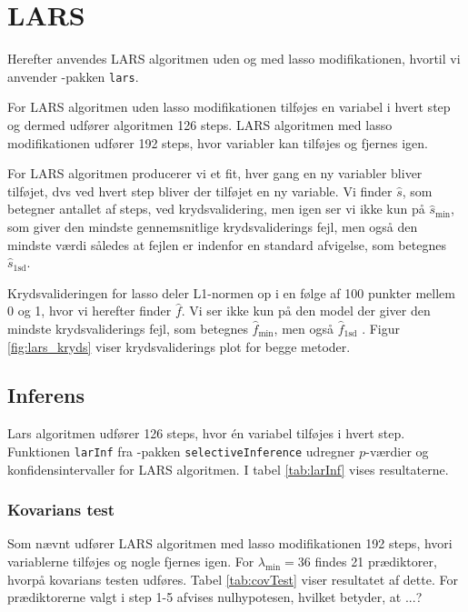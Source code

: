 \section{LARS}
Herefter anvendes LARS algoritmen uden og med lasso modifikationen, hvortil vi anvender \Rlang-pakken \texttt{lars}.

For LARS algoritmen uden lasso modifikationen tilføjes en variabel i hvert step og dermed udfører algoritmen 126 steps.
LARS algoritmen med lasso modifikationen udfører 192 steps, hvor variabler kan tilføjes og fjernes igen.



For LARS algoritmen producerer vi et fit, hver gang en ny variabler bliver tilføjet, dvs ved hvert step bliver der tilføjet en ny variable. 
Vi finder $\widehat{s}$, som betegner antallet af steps, ved krydsvalidering, men igen ser vi ikke kun på  $\widehat{s}_{\min}$, som giver den mindste gennemsnitlige krydsvaliderings fejl, men også den mindste værdi således at fejlen er indenfor en standard afvigelse, som betegnes $\widehat{s}_{\text{1sd}}$. 

Krydsvalideringen for lasso deler L1-normen op i en følge af 100 punkter mellem 0 og 1, hvor vi herefter finder $\widehat{f}$. Vi ser ikke kun på den model der giver den mindste krydsvaliderings fejl, som betegnes  $\widehat{f}_{\min}$, men også  $\widehat{f}_{\text{1sd}}$ . 
Figur \ref{fig:lars_kryds} viser krydsvaliderings plot for begge metoder. 



\newpage
\subsection{Inferens}
Lars algoritmen udfører 126 steps, hvor én variabel tilføjes i hvert step.
Funktionen \texttt{larInf} fra \Rlang-pakken \texttt{selectiveInference} udregner \(p\)-værdier og konfidensintervaller for LARS algoritmen.
I tabel \ref{tab:larInf} vises resultaterne.
%

%

\subsubsection{Kovarians test}
Som nævnt udfører LARS algoritmen med lasso modifikationen 192 steps, hvori variablerne tilføjes og nogle fjernes igen.
For \(\lambda_\text{min} = 36\) findes 21 prædiktorer, hvorpå kovarians testen udføres.
Tabel \ref{tab:covTest} viser resultatet af dette.
For prædiktorerne valgt i step 1-5 afvises nulhypotesen, hvilket betyder, at ...?
%

%



